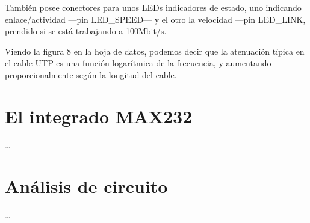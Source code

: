 \documentclass[a4paper]{article}
\begin{document}
También posee conectores para unos LEDs indicadores de estado, uno indicando enlace/actividad ---pin
LED\_SPEED--- y el otro la velocidad ---pin LED\_LINK, prendido si se está trabajando a 100Mbit/s.

Viendo la figura 8 en la hoja de datos, podemos decir que la atenuación típica en el cable UTP es una
función logarítmica de la frecuencia, y aumentando proporcionalmente según la longitud del cable.
%
\section{El integrado MAX232}
%
\ldots
%
\section{Análisis de circuito}
%
\ldots
%
\end{document}
